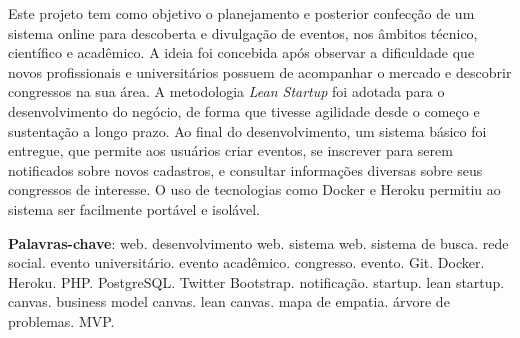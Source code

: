\documentclass[12pt,a4paper,twoside,hyphens,english,brazil]{abntex2}
\begin{document}
\frenchspacing %

\imprimircapa
\imprimirfolhaderosto*

%	

%	

\begin{resumo}
	Este projeto tem como objetivo o planejamento e posterior confecção de um sistema online para descoberta e divulgação de eventos, nos âmbitos técnico, científico e acadêmico. A ideia foi concebida após observar a dificuldade que novos profissionais e universitários possuem de acompanhar o mercado e descobrir congressos na sua área. A metodologia \emph{Lean Startup} foi adotada para o desenvolvimento do negócio, de forma que tivesse agilidade desde o começo e sustentação a longo prazo. Ao final do desenvolvimento, um sistema básico foi entregue, que permite aos usuários criar eventos, se inscrever para serem notificados sobre novos cadastros, e consultar informações diversas sobre seus congressos de interesse. O uso de tecnologias como Docker e Heroku permitiu ao sistema ser facilmente portável e isolável.
	
	\vspace{\onelineskip}
	\textbf{Palavras-chave}: web. desenvolvimento web. sistema web. sistema de busca. rede social. evento universitário. evento acadêmico. congresso. evento. Git. Docker. Heroku. PHP. PostgreSQL. Twitter Bootstrap. notificação. startup. lean startup. canvas. business model canvas. lean canvas. mapa de empatia. árvore de problemas. MVP.
\end{resumo}
\end{document}
